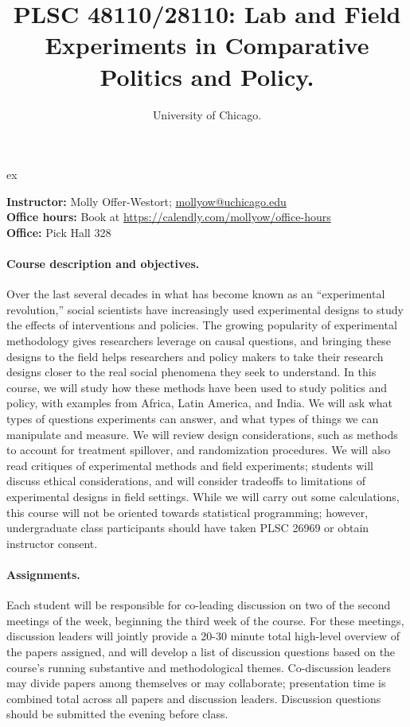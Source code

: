 \documentclass[letterpaper,12pt,parskip=full,DIV=10]{scrartcl}
\title{PLSC 48110/28110: Lab and Field Experiments in Comparative Politics and Policy.}
\subtitle{University of Chicago.}
\author{}
\date{}
\newcommand{\OfficeHoursBookingURL}{https://calendly.com/mollyow/office-hours}
\begin{document}
\maketitle
{} ex

\textbf{Instructor:} Molly Offer-Westort; \href{mailto:mollyow@uchicago.edu}{mollyow@uchicago.edu}\\
\textbf{Office hours:} Book at \expandafter\url\expandafter{\OfficeHoursBookingURL}\\
\textbf{Office:} Pick Hall 328

\paragraph{Course description and objectives.}


Over the last several decades in what has become known as an ``experimental revolution,'' social scientists have increasingly used experimental designs to study the effects of interventions and policies. The growing popularity of experimental methodology gives researchers leverage on causal questions, and bringing these designs to the field helps researchers and policy makers to take their research designs closer to the real social phenomena they seek to understand. In this course, we will study how these methods have been used to study politics and policy, with examples from Africa, Latin America, and India. We will ask what types of questions experiments can answer, and what types of things we can manipulate and measure. We will review design considerations, such as methods to account for treatment spillover, and randomization procedures. We will also read critiques of experimental methods and field experiments; students will discuss ethical considerations, and will consider tradeoffs to limitations of experimental designs in field settings. While we will carry out some calculations, this course will not be oriented towards statistical programming; however, undergraduate class participants should have taken PLSC 26969 or obtain instructor consent.

\paragraph{Assignments.}

Each student will be responsible for co-leading discussion on two of the second meetings of the week, beginning the third week of the course. For these meetings, discussion leaders will jointly provide a 20-30 minute total high-level overview of the papers assigned, and will develop a list of discussion questions based on the course's running substantive and methodological themes. Co-discussion leaders may divide papers among themselves or may collaborate; presentation time is combined total across all papers and discussion leaders. Discussion questions should be submitted the evening before class.
\end{document}
